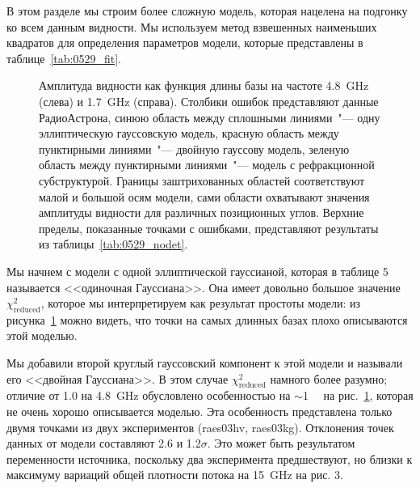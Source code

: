 В этом разделе мы строим более сложную модель, которая нацелена на подгонку ко всем данным
видности. Мы используем метод взвешенных наименьших квадратов для определения параметров модели,
которые представлены в таблице~\ref{tab:0529_fit}.

\begin{figure}[tbh]
\caption{Амплитуда видности как функция длины базы на частоте \SI{4.8}{\GHz} (слева) и
\SI{1.7}{\GHz} (справа). Столбики ошибок представляют данные РадиоАстрона, синюю область между
сплошными линиями~"--- одну эллиптическую гауссовскую модель, красную область между пунктирными
линиями~"--- двойную гауссову модель, зеленую область между пунктирными линиями~"--- модель с
рефракционной субструктурой. Границы заштрихованных областей соответствуют малой и большой осям
модели, сами области охватывают значения амплитуды видности для различных позиционных углов.
Верхние пределы, показанные точками с ошибками, представляют результаты из
таблицы~\ref{tab:0529_nodet}.}
\label{fig:0529_1dplot}
\end{figure}

Мы начнем с модели с одной эллиптической гауссианой, которая в таблице 5 называется
<<одиночная Гауссиана>>. Она имеет довольно большое значение $\chi^2_\text{reduced}$, которое мы
интерпретируем как результат простоты модели: из рисунка~\ref{fig:0529_1dplot} можно видеть, что
точки на самых длинных базах плохо описываются этой моделью.

Мы добавили второй круглый гауссовский компонент к этой модели и называли его <<двойная
Гауссиана>>. В этом случае $\chi^2_\text{reduced}$ намного более разумно; отличие от 1.0 на
\SI{4.8}{\GHz} обусловлено особенностью на $\sim$\SI{1}{\giga\la} на рис.~\ref{fig:0529_1dplot},
которая не очень хорошо описывается моделью. Эта особенность представлена только двумя точками из
двух экспериментов (raes03hv, raes03kg). Отклонения точек данных от модели составляют 2.6 и
1.2$\sigma$. Это может быть результатом переменности источника, поскольку два эксперимента
предшествуют, но близки к максимуму вариаций общей плотности потока на \SI{15}{\GHz} на рис. 3.

